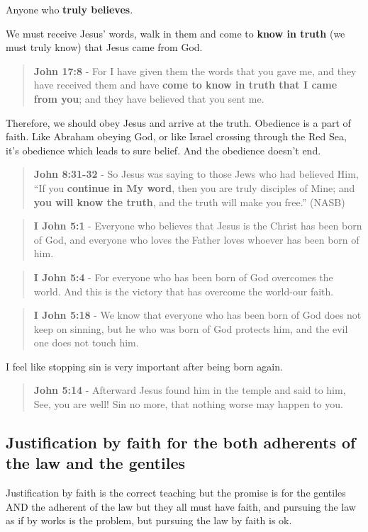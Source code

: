 \documentclass[11pt]{article}
\begin{document}
Anyone who \textbf{truly believes}.

We must receive Jesus' words, walk in them and come to \textbf{know in truth} (we must truly know) that Jesus came from God.

\begin{quote}
\textbf{John 17:8} - For I have given them the words that you gave me, and they have received them and have \textbf{come to know in truth that I came from you}; and they have believed that you sent me.
\end{quote}

Therefore, we should obey Jesus and arrive at the truth. Obedience is a part of faith. Like Abraham obeying God, or like Israel crossing through the Red Sea, it's obedience which leads to sure belief.
And the obedience doesn't end.

\begin{quote}
\textbf{John 8:31-32} - So Jesus was saying to those Jews who had believed Him, “If you \textbf{continue in My word}, then you are truly disciples of Mine; and \textbf{you will know the truth}, and the truth will make you free.” (NASB)
\end{quote}

\begin{quote}
\textbf{I John 5:1} - Everyone who believes that Jesus is the Christ has been born of God, and everyone who loves the Father loves whoever has been born of him.
\end{quote}

\begin{quote}
\textbf{I John 5:4} - For everyone who has been born of God overcomes the world. And this is the victory that has overcome the world-our faith.
\end{quote}

\begin{quote}
\textbf{I John 5:18} - We know that everyone who has been born of God does not keep on sinning, but he who was born of God protects him, and the evil one does not touch him.
\end{quote}

I feel like stopping sin is very important after being born again.

\begin{quote}
\textbf{John 5:14} - Afterward Jesus found him in the temple and said to him, See, you are well! Sin no more, that nothing worse may happen to you.
\end{quote}

\subsection{Justification by faith for the both adherents of the law and the gentiles}
\label{sec:org98541a6}
Justification by faith is the correct teaching but the promise is for the gentiles AND the adherent of the law but they all must have faith, and pursuing the law as if by works is the problem, but pursuing the law by faith is ok.
\end{document}
